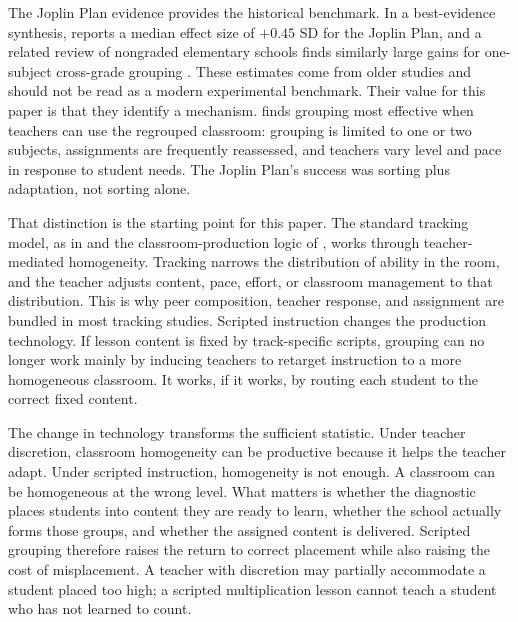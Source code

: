 \documentclass[11pt]{article}
\begin{document}
The Joplin Plan evidence provides the historical benchmark. In a best-evidence synthesis, \citet{slavin1987ability} reports a median effect size of $+0.45$ SD for the Joplin Plan, and a related review of nongraded elementary schools finds similarly large gains for one-subject cross-grade grouping \citep{gutierrezslavin1992}. These estimates come from older studies and should not be read as a modern experimental benchmark. Their value for this paper is that they identify a mechanism. \citet{slavin1987ability} finds grouping most effective when teachers can use the regrouped classroom: grouping is limited to one or two subjects, assignments are frequently reassessed, and teachers vary level and pace in response to student needs. The Joplin Plan's success was sorting plus adaptation, not sorting alone.

That distinction is the starting point for this paper. The standard tracking model, as in \citet{duflo2011peer} and the classroom-production logic of \citet{Lazear2001}, works through teacher-mediated homogeneity. Tracking narrows the distribution of ability in the room, and the teacher adjusts content, pace, effort, or classroom management to that distribution. This is why peer composition, teacher response, and assignment are bundled in most tracking studies. Scripted instruction changes the production technology. If lesson content is fixed by track-specific scripts, grouping can no longer work mainly by inducing teachers to retarget instruction to a more homogeneous classroom. It works, if it works, by routing each student to the correct fixed content.

The change in technology transforms the sufficient statistic. Under teacher discretion, classroom homogeneity can be productive because it helps the teacher adapt. Under scripted instruction, homogeneity is not enough. A classroom can be homogeneous at the wrong level. What matters is whether the diagnostic places students into content they are ready to learn, whether the school actually forms those groups, and whether the assigned content is delivered. Scripted grouping therefore raises the return to correct placement while also raising the cost of misplacement. A teacher with discretion may partially accommodate a student placed too high; a scripted multiplication lesson cannot teach a student who has not learned to count.
\end{document}
